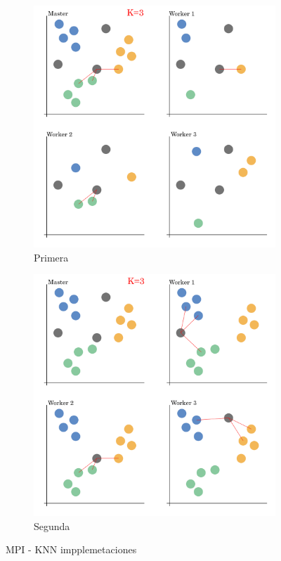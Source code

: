 \begin{figure}[!h]
			
			\begin{subfigure}[t]{0.45\textwidth}
				\centering
				\includegraphics[width=\textwidth]{images/chapter_3/knn_mpi1}
				\caption{Primera}
				\label{fig:knn1}
			\end{subfigure}
			\hfill
			\begin{subfigure}[t]{0.45\textwidth}
				\centering
				\includegraphics[width=\textwidth]{images/chapter_3/knn_mpi2}
				\caption{Segunda}
				\label{fig:knn2}
			\end{subfigure}
			
			\caption{MPI - KNN impplemetaciones}
			\label{fig:knnmpi}
		\end{figure}

